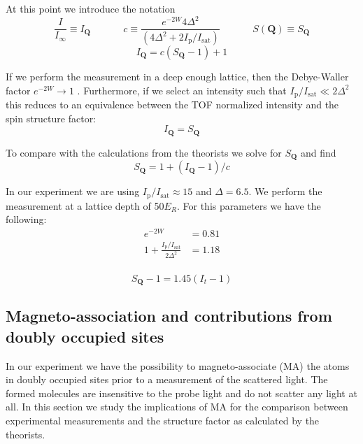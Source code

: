 \documentclass[11pt,letter]{article}
\newcommand{\bv}[1]{\ensuremath{\bm{#1}}}
\newcommand{\iisat}{\ensuremath{I_{\mathrm{p}}/I_{\mathrm{sat}}}}
\newcommand{\itof}{\ensuremath{I_{\infty} }}
\begin{document}
At this point we introduce the notation
\begin{equation}
 \frac{I}{\itof} \equiv I_{\bv{Q}} 
   \ \ \ \ \ \ \  \ \ \ \ \ \ \ \  
      c \equiv \frac{ e^{-2W}4 \Delta^{2}  } 
           {(4 \Delta^{2} + 2 \iisat) }
   \ \ \ \ \ \ \  \ \ \ \ \ \ \ \ 
    S(\bv{Q}) \equiv S_{\bv{Q}}
\end{equation} 
\begin{equation}
  I_{\bv{Q}} = c ( S_{\bv{Q}} - 1 ) + 1 
\end{equation}
 
If we perform the measurement in a deep enough lattice, then the Debye-Waller
factor $e^{-2W} \rightarrow 1 $ .   Furthermore, if we select an intensity such
that $ \iisat \ll 2\Delta^{2} $  this reduces to an equivalence between the TOF
normalized intensity and the spin structure factor:
\begin{equation}
  I_{\bv{Q}} = S_{\bv{Q}} 
\end{equation}

To compare with the calculations from the theorists we solve for $S_{\bv{Q}}$
and find
\begin{equation} 
  S_{\bv{Q}} = 1 + \left( I_{\bv{Q}}  - 1
\right)/c 
\end{equation}

In our experiment we are using $\iisat \approx 15$ and $\Delta = 6.5$.   We
perform the measurement at a lattice depth of 50$E_{R}$.  For this parameters
we have the following: 
\begin{equation}
\begin{split}
  e^{-2W} & =  0.81\\
  1  +   \frac{\iisat}{2\Delta^{2} } & =  1.18\\  
\end{split}
\end{equation} 

\begin{equation} 
  S_{\bv{Q}} - 1  =   1.45 (I_{t} - 1)
\end{equation}

\subsection{Magneto-association and contributions from doubly occupied sites} 

In our experiment we have the possibility to  magneto-associate (MA) the atoms
in doubly occupied sites prior to a measurement of the scattered light.  The
formed molecules  are insensitive to the probe light and do not scatter any
light at all. In this section we study the implications of MA for the
comparison between experimental measurements and the structure factor as
calculated by the theorists. 
\end{document}

